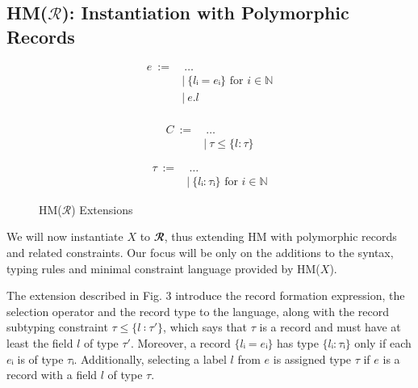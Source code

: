 \documentclass[runningheads]{llncs}
\newcommand{\hmx}{HM($X$)}
\newcommand{\hmr}{HM($ℛ$)}
\begin{document}
\subsection{\hmr{}: Instantiation with Polymorphic Records}
\begin{figure}[t]
  \begin{subfigure}[t]{0.3\textwidth}
    \begin{align*}
      e \ := & \ \dots                            \\
             & | \ \{lᵢ = eᵢ\} \text{ for } i ∈ ℕ \\
             & | \ e.l                            \\
    \end{align*}
  \end{subfigure}
  \begin{subfigure}[t]{0.3\textwidth}
    \begin{align*}
      C \ := & \ \dots           \\
             & | \ τ ≤ \{l : τ\}
    \end{align*}
  \end{subfigure}
  \begin{subfigure}[t]{0.3\textwidth}
    \begin{align*}
      τ \ := & \ \dots                            \\
             & | \ \{lᵢ : τᵢ\} \text{ for } i ∈ ℕ
    \end{align*}
  \end{subfigure}
  \centering
  \caption{\hmr{} Extensions}
\end{figure}
We will now instantiate $X$ to $𝓡$, thus extending HM with
polymorphic records and related constraints. Our focus will be only on the
additions to the syntax, typing rules and minimal constraint language provided
by \hmx{}.

The extension described in Fig. 3 introduce the record formation expression,
the selection
operator and the record type to the language, along with the
record subtyping constraint $τ ≤ \{l ∶ τ'\}$, which says that $τ$ is a record
and must have at least the field $l$ of type $τ'$.
Moreover, a record $\{lᵢ = eᵢ\}$ has type $\{lᵢ : τᵢ\}$ only if each
$eᵢ$ is of type $τᵢ$. Additionally, selecting a label $l$ from $e$ is assigned
type $τ$ if $e$ is a record with a field $l$ of type $τ$.
\end{document}
